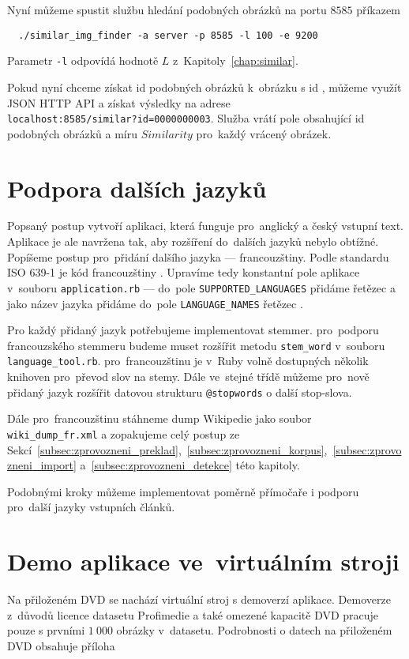 Nyní můžeme spustit službu hledání podobných obrázků na portu $8585$ příkazem

\begin{lstlisting}
  ./similar_img_finder -a server -p 8585 -l 100 -e 9200
\end{lstlisting}

Parametr \lstinline{-l} odpovídá hodnotě $L$ z~Kapitoly~\ref{chap:similar}.

Pokud nyní chceme získat id podobných obrázků k~obrázku s id , můžeme využít JSON HTTP API a získat výsledky na adrese\\\lstinline{localhost:8585/similar?id=0000000003}. Služba vrátí pole obsahující id podobných obrázků a míru $Similarity$ pro~každý vrácený obrázek.

\section{Podpora dalších jazyků}
\label{subsec:zprovozneni_podpora}

Popsaný postup vytvoří aplikaci, která funguje pro~anglický a český vstupní text. Aplikace je ale navržena tak, aby rozšíření do~dalších jazyků nebylo obtížné. Popíšeme postup pro~přidání dalšího jazyka --- francouzštiny. Podle standardu ISO 639-1 je kód francouzštiny . Upravíme tedy konstantní pole aplikace v~souboru \lstinline{application.rb} --- do~pole \lstinline{SUPPORTED_LANGUAGES} přidáme řetězec  a jako název jazyka přidáme do~pole \lstinline{LANGUAGE_NAMES} řetězec .

Pro každý přidaný jazyk potřebujeme implementovat stemmer. pro~podporu francouzského stemmeru budeme muset rozšířit metodu \lstinline{stem_word} v~souboru \lstinline{language_tool.rb}. pro~francouzštinu je v~Ruby volně dostupných několik knihoven pro~převod slov na stemy. Dále ve~stejné třídě můžeme pro~nově přidaný jazyk rozšířit datovou strukturu \lstinline{@stopwords} o další stop-slova.

Dále pro~francouzštinu stáhneme dump Wikipedie jako soubor\\\lstinline{wiki_dump_fr.xml} a zopakujeme celý postup ze Sekcí~\ref{subsec:zprovozneni_preklad},~\ref{subsec:zprovozneni_korpus},~\ref{subsec:zprovozneni_import} a~\ref{subsec:zprovozneni_detekce} této kapitoly.

Podobnými kroky můžeme implementovat poměrně přímočaře i podporu pro~další jazyky vstupních článků.

\section{Demo aplikace ve~virtuálním stroji}

Na přiloženém DVD se nachází virtuální stroj s demoverzí aplikace. Demoverze z~důvodů licence datasetu Profimedie a také omezené kapacitě DVD pracuje pouze s prvními $1\ 000$ obrázky v~datasetu. Podrobnosti o datech na přiloženém DVD obsahuje příloha 







